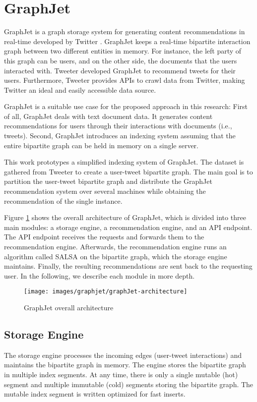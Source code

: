 \section{GraphJet}
\label{sec:GraphJet}
GraphJet is a graph storage system for generating content recommendations in real-time developed by Twitter \cite{sharmaGraphJetRealtimeContent2016}. GraphJet keeps a real-time bipartite interaction graph between two different entities in memory. For instance, the left party of this graph can be users, and on the other side, the documents that the users interacted with. Tweeter developed GraphJet to recommend tweets for their users. Furthermore, Tweeter provides APIs to crawl data from Twitter, making Twitter an ideal and easily accessible data source.


GraphJet is a suitable use case for the proposed approach in this research: First of all, GraphJet deals with text document data. It generates content recommendations for users through their interactions with documents (i.e., tweets). Second, GraphJet introduces an indexing system assuming that the entire bipartite graph can be held in memory on a single server.


This work prototypes a simplified indexing system of GraphJet. The dataset is gathered from Tweeter to create a user-tweet bipartite graph. The main goal is to partition the user-tweet bipartite graph and distribute the GraphJet recommendation system over several machines while obtaining the recommendation of the single instance.


Figure \ref{fig:graphJet-architecture} shows the overall architecture of GraphJet, which is divided into three main modules: a storage engine, a recommendation engine, and an API endpoint. The API endpoint receives the requests and forwards them to the recommendation engine. Afterwards, the recommendation engine runs an algorithm called SALSA \cite{lempelSALSAStochasticApproach2001} on the bipartite graph, which the storage engine maintains. Finally, the resulting recommendations are sent back to the requesting user. In the following, we describe each module in more depth. 

\begin{figure}[!htb]
    \centering
    \texttt{[image: images/graphjet/graphJet-architecture]}
    \caption{GraphJet overall architecture \cite{sharmaGraphJetRealtimeContent2016}}
    \label{fig:graphJet-architecture}
\end{figure}


\subsection{Storage Engine}
\label{subsec:GraphJet-Storage-Engine}
The storage engine processes the incoming edges (user-tweet interactions) and maintains the bipartite graph in memory. The engine stores the bipartite graph in multiple index segments. At any time, there is only a single mutable (hot) segment and multiple immutable (cold) segments storing the bipartite graph. The mutable index segment is written optimized for fast inserts. 

